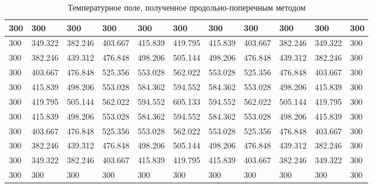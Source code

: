 \documentclass[12pt, a4paper]{article}
\begin{document}
\begin{table}[ht]
	\small
	\caption{Температурное поле, полученное продольно-поперечным методом}
	\label{tbl:adi}
	\begin{tabular}{|l|l|l|l|l|l|l|l|l|l|l|}
		\hline
		300 & 300     & 300     & 300     & 300     & 300     & 300     & 300     & 300     & 300     & 300 \\ \hline
		300 & 349.322 & 382.246 & 403.667 & 415.839 & 419.795 & 415.839 & 403.667 & 382.246 & 349.322 & 300 \\ \hline
		300 & 382.246 & 439.312 & 476.848 & 498.206 & 505.144 & 498.206 & 476.848 & 439.312 & 382.246 & 300 \\ \hline
		300 & 403.667 & 476.848 & 525.356 & 553.028 & 562.022 & 553.028 & 525.356 & 476.848 & 403.667 & 300 \\ \hline
		300 & 415.839 & 498.206 & 553.028 & 584.362 & 594.552 & 584.362 & 553.028 & 498.206 & 415.839 & 300 \\ \hline
		300 & 419.795 & 505.144 & 562.022 & 594.552 & 605.133 & 594.552 & 562.022 & 505.144 & 419.795 & 300 \\ \hline
		300 & 415.839 & 498.206 & 553.028 & 584.362 & 594.552 & 584.362 & 553.028 & 498.206 & 415.839 & 300 \\ \hline
		300 & 403.667 & 476.848 & 525.356 & 553.028 & 562.022 & 553.028 & 525.356 & 476.848 & 403.667 & 300 \\ \hline
		300 & 382.246 & 439.312 & 476.848 & 498.206 & 505.144 & 498.206 & 476.848 & 439.312 & 382.246 & 300 \\ \hline
		300 & 349.322 & 382.246 & 403.667 & 415.839 & 419.795 & 415.839 & 403.667 & 382.246 & 349.322 & 300 \\ \hline
		300 & 300     & 300     & 300     & 300     & 300     & 300     & 300     & 300     & 300     & 300 \\ \hline
	\end{tabular}
\end{table}
\end{document}
